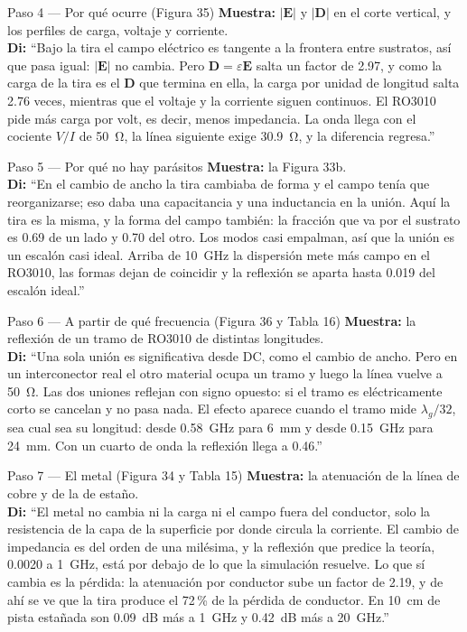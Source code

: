\documentclass[11pt,letterpaper]{article}
\begin{document}
\begin{paso}{Paso 4 --- Por qué ocurre (Figura 35)}
\textbf{Muestra:} $|\mathbf{E}|$ y $|\mathbf{D}|$ en el corte vertical, y los perfiles de carga, voltaje y corriente.\\
\textbf{Di:} ``Bajo la tira el campo eléctrico es tangente a la frontera entre sustratos, así que pasa igual: $|\mathbf{E}|$ no cambia. Pero $\mathbf{D}=\varepsilon\mathbf{E}$ salta un factor de 2.97, y como la carga de la tira es el $\mathbf{D}$ que termina en ella, la carga por unidad de longitud salta 2.76 veces, mientras que el voltaje y la corriente siguen continuos. El RO3010 pide más carga por volt, es decir, menos impedancia. La onda llega con el cociente $V/I$ de \SI{50}{\ohm}, la línea siguiente exige \SI{30.9}{\ohm}, y la diferencia regresa.''
\end{paso}

\begin{paso}{Paso 5 --- Por qué no hay parásitos}
\textbf{Muestra:} la Figura 33b.\\
\textbf{Di:} ``En el cambio de ancho la tira cambiaba de forma y el campo tenía que reorganizarse; eso daba una capacitancia y una inductancia en la unión. Aquí la tira es la misma, y la forma del campo también: la fracción que va por el sustrato es 0.69 de un lado y 0.70 del otro. Los modos casi empalman, así que la unión es un escalón casi ideal. Arriba de \SI{10}{GHz} la dispersión mete más campo en el RO3010, las formas dejan de coincidir y la reflexión se aparta hasta 0.019 del escalón ideal.''
\end{paso}

\begin{paso}{Paso 6 --- A partir de qué frecuencia (Figura 36 y Tabla 16)}
\textbf{Muestra:} la reflexión de un tramo de RO3010 de distintas longitudes.\\
\textbf{Di:} ``Una sola unión es significativa desde DC, como el cambio de ancho. Pero en un interconector real el otro material ocupa un tramo y luego la línea vuelve a \SI{50}{\ohm}. Las dos uniones reflejan con signo opuesto: si el tramo es eléctricamente corto se cancelan y no pasa nada. El efecto aparece cuando el tramo mide $\lambda_g/32$, sea cual sea su longitud: desde \SI{0.58}{GHz} para \SI{6}{mm} y desde \SI{0.15}{GHz} para \SI{24}{mm}. Con un cuarto de onda la reflexión llega a 0.46.''
\end{paso}

\begin{paso}{Paso 7 --- El metal (Figura 34 y Tabla 15)}
\textbf{Muestra:} la atenuación de la línea de cobre y de la de estaño.\\
\textbf{Di:} ``El metal no cambia ni la carga ni el campo fuera del conductor, solo la resistencia de la capa de la superficie por donde circula la corriente. El cambio de impedancia es del orden de una milésima, y la reflexión que predice la teoría, 0.0020 a \SI{1}{GHz}, está por debajo de lo que la simulación resuelve. Lo que sí cambia es la pérdida: la atenuación por conductor sube un factor de 2.19, y de ahí se ve que la tira produce el 72\,\% de la pérdida de conductor. En \SI{10}{cm} de pista estañada son \SI{0.09}{dB} más a \SI{1}{GHz} y \SI{0.42}{dB} más a \SI{20}{GHz}.''
\end{paso}
\end{document}
